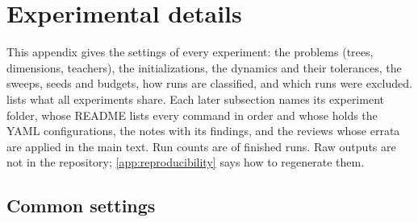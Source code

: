 \section{Experimental details}\label{app:experiments}

This appendix gives the settings of every experiment: the problems (trees, dimensions, teachers), the
initializations, the dynamics and their tolerances, the sweeps, seeds and budgets, how runs are
classified, and which runs were excluded.  lists what all experiments share.
Each later subsection names its experiment folder, whose README lists every command in order and whose
 holds the YAML configurations, the notes with its findings, and the reviews whose
errata are applied in the main text. Run counts are of finished runs. Raw outputs are not in the
repository; \cref{app:reproducibility} says how to regenerate them.

\subsection{Common settings}\label{app:exp-common}

